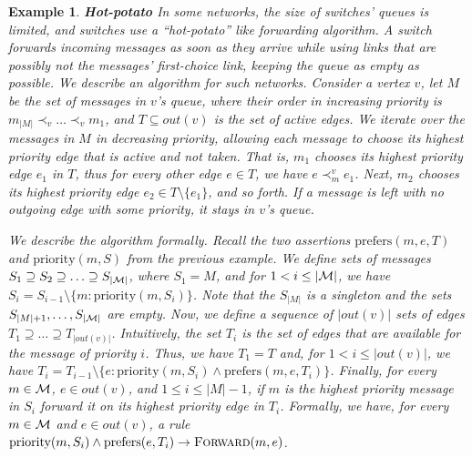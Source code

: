 \documentclass[11pt,eepic]{article}
\newcommand{\set}[1]{\{ #1  \}}
\newcommand{\M}{{\cal M}}
\newcommand{\Forw}{\mbox{\sc Forward}}
\newtheorem{exmpl}[theorem]{Example}
\newenvironment{example}{\begin{exmpl}\rm}{\hspace{\stretch{1}}\end{exmpl}}
\begin{document}
	\begin{example}	{\bf Hot-potato} 
	\label{ex:hot-potato}
		In some networks, the size of switches' queues is limited, and switches use a ``hot-potato'' like forwarding algorithm. A switch forwards incoming messages as soon as they arrive while using links that are possibly not the messages' first-choice link, keeping the queue as empty as possible. We describe an algorithm for such networks. Consider a vertex $v$, let $M$ be the set of messages in $v$'s queue, where their order in increasing priority is $m_{|M|} \prec_v \ldots \prec_v m_1$, and $T \subseteq out(v)$ is the set of active edges. We iterate over the messages in $M$ in decreasing priority, allowing each message to choose its highest priority edge that is active and not taken. That is, $m_1$ chooses its highest priority edge $e_1$ in $T$, thus for every other edge $e \in T$, we have $e \prec_m^v e_1$. Next, $m_2$ chooses its highest priority edge $e_2 \in T \setminus \set{e_1}$, and so forth. If a message is left with no outgoing edge with some priority, it stays in $v$'s queue. 

		We describe the algorithm formally.  Recall the two assertions $\mbox{prefers}(m, e, T)$ and $\mbox{priority}(m, S)$ from the previous example. We define sets of messages $S_1 \supseteq S_2 \supseteq \ldots \supseteq S_{|\M|}$, where $S_1 = M$, and for $1 < i \leq |\M|$, we have $S_i = S_{i-1} \setminus \set{m :\mbox{priority}(m, S_i)}$. Note that the $S_{|M|}$ is a singleton and the sets $S_{|M|+1}, \ldots, S_{|\M|}$ are empty. Now, we define a sequence of $|out(v)|$ sets of edges $T_1 \supseteq \ldots \supseteq T_{|out(v)|}$. Intuitively, the set $T_i$ is the set of edges that are available for the message of priority $i$. Thus, we have $T_1 = T$ and, for $1 < i \leq |out(v)|$, we have $T_i = T_{i-1} \setminus \set{e: \mbox{priority}(m, S_i) \wedge \mbox{prefers}(m, e, T_i)}$. Finally, for every $m \in \M$, $e \in out(v)$, and $1 \leq i \leq |M|-1$, if $m$ is the highest priority message in $S_i$ forward it on its highest priority edge in $T_i$.  Formally, we have, for every $m \in \M$ and $e \in out(v)$, a rule $\mbox{priority}(m, S_i) \wedge \mbox{prefers}(e, T_i) \rightarrow \Forw(m, e)$.
		\end{example}
\end{document}
